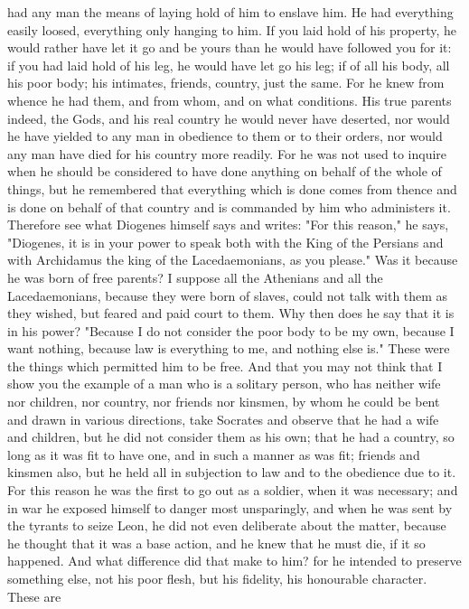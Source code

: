 \documentclass[a4paper]{article}
\begin{document}
had any man the means of laying hold of him to enslave him. He had everything
easily loosed, everything only hanging to him. If you laid hold of his
property, he would rather have let it go and be yours than he would have
followed you for it: if you had laid hold of his leg, he would have let go his
leg; if of all his body, all his poor body; his intimates, friends, country,
just the same. For he knew from whence he had them, and from whom, and on what
conditions. His true parents indeed, the Gods, and his real country he would
never have deserted, nor would he have yielded to any man in obedience to them
or to their orders, nor would any man have died for his country more readily.
For he was not used to inquire when he should be considered to have done
anything on behalf of the whole of things, but he remembered that everything
which is done comes from thence and is done on behalf of that country and is
commanded by him who administers it. Therefore see what Diogenes himself says
and writes: "For this reason," he says, "Diogenes, it is in your power to speak
both with the King of the Persians and with Archidamus the king of the
Lacedaemonians, as you please." Was it because he was born of free parents? I
suppose all the Athenians and all the Lacedaemonians, because they were born of
slaves, could not talk with them as they wished, but feared and paid court to
them. Why then does he say that it is in his power? "Because I do not consider
the poor body to be my own, because I want nothing, because law is everything
to me, and nothing else is." These were the things which permitted him to be
free.
    And that you may not think that I show you the example of a man who is a
solitary person, who has neither wife nor children, nor country, nor friends
nor kinsmen, by whom he could be bent and drawn in various directions, take
Socrates and observe that he had a wife and children, but he did not consider
them as his own; that he had a country, so long as it was fit to have one, and
in such a manner as was fit; friends and kinsmen also, but he held all in
subjection to law and to the obedience due to it. For this reason he was the
first to go out as a soldier, when it was necessary; and in war he exposed
himself to danger most unsparingly, and when he was sent by the tyrants to
seize Leon, he did not even deliberate about the matter, because he thought
that it was a base action, and he knew that he must die, if it so happened. And
what difference did that make to him? for he intended to preserve something
else, not his poor flesh, but his fidelity, his honourable character. These are
\end{document}

